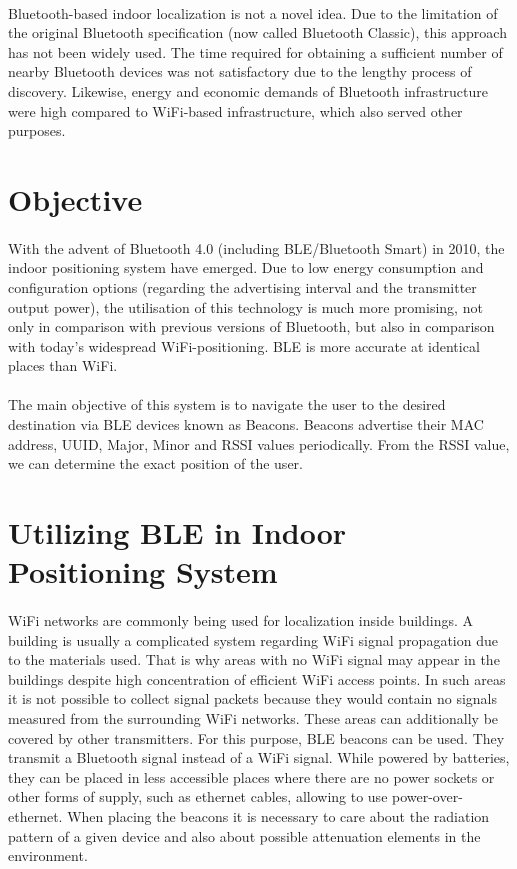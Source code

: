 \documentclass[a4paper,12pt]{report}
\begin{document}
\paragraph{}Bluetooth-based indoor localization is not a novel idea. Due to the limitation of the original Bluetooth specification (now called Bluetooth Classic), this approach has not been widely used. The time required for obtaining a sufficient number of nearby Bluetooth devices was not satisfactory due to the lengthy process of discovery. Likewise, energy and economic demands of Bluetooth infrastructure were high compared to WiFi-based infrastructure, which also served other purposes.
\section{Objective}
\paragraph{}With the advent of Bluetooth 4.0 (including BLE/Bluetooth Smart) in 2010, the indoor positioning system have emerged. Due to low energy consumption and configuration options (regarding the advertising interval and the transmitter output power), the utilisation of this technology is much more promising, not only in comparison with previous versions of Bluetooth, but also in comparison with today’s widespread WiFi-positioning. BLE is more accurate at identical places than WiFi.
\paragraph{}The main objective of this system is to navigate the user to the desired destination via BLE devices known as Beacons. Beacons advertise their MAC address, UUID, Major, Minor and RSSI values periodically. From the RSSI value, we can determine the exact position of the user. 
\section{Utilizing BLE in Indoor Positioning System}
\paragraph{}WiFi networks are commonly being used for localization inside buildings. A building is usually a complicated system regarding WiFi signal propagation due to the materials used. That is why areas with no WiFi signal may appear in the buildings despite high concentration of efficient WiFi access points. In such areas it is not possible to collect signal packets because they would contain no signals measured from the surrounding WiFi networks. These areas can additionally be covered by other transmitters. For this purpose, BLE beacons can be used. They transmit a Bluetooth signal instead of a WiFi signal. While powered by batteries, they can be placed in less accessible places where there are no power sockets or other forms of supply, such as ethernet cables, allowing to use power-over-ethernet. When placing the beacons it is necessary to care about the radiation pattern of a given device and also about possible attenuation elements in the environment.
\end{document}
